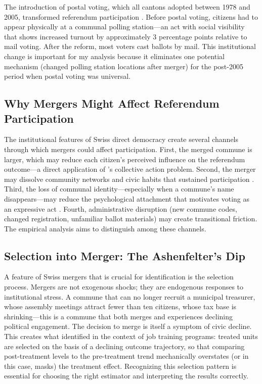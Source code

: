 \documentclass[12pt]{article}
\begin{document}
The introduction of postal voting, which all cantons adopted between 1978 and 2005, transformed referendum participation \citep{funk2010social}. Before postal voting, citizens had to appear physically at a communal polling station---an act with social visibility that \citet{funk2010social} shows increased turnout by approximately 3 percentage points relative to mail voting. After the reform, most voters cast ballots by mail. This institutional change is important for my analysis because it eliminates one potential mechanism (changed polling station locations after merger) for the post-2005 period when postal voting was universal.

\subsection{Why Mergers Might Affect Referendum Participation}

The institutional features of Swiss direct democracy create several channels through which mergers could affect participation. First, the merged commune is larger, which may reduce each citizen's perceived influence on the referendum outcome---a direct application of \citet{olson1965logic}'s collective action problem. Second, the merger may dissolve community networks and civic habits that sustained participation \citep{putnam1993making, freitag2006bowling}. Third, the loss of communal identity---especially when a commune's name disappears---may reduce the psychological attachment that motivates voting as an expressive act \citep{dellavigna2017voting}. Fourth, administrative disruption (new commune codes, changed registration, unfamiliar ballot materials) may create transitional friction. The empirical analysis aims to distinguish among these channels.

\subsection{Selection into Merger: The Ashenfelter's Dip}

A feature of Swiss mergers that is crucial for identification is the selection process. Mergers are not exogenous shocks; they are endogenous responses to institutional stress. A commune that can no longer recruit a municipal treasurer, whose assembly meetings attract fewer than ten citizens, whose tax base is shrinking---this is a commune that both merges and experiences declining political engagement. The decision to merge is itself a symptom of civic decline. This creates what \citet{ashenfelter1978estimating} identified in the context of job training programs: treated units are selected on the basis of a declining outcome trajectory, so that comparing post-treatment levels to the pre-treatment trend mechanically overstates (or in this case, masks) the treatment effect. Recognizing this selection pattern is essential for choosing the right estimator and interpreting the results correctly.
\end{document}
